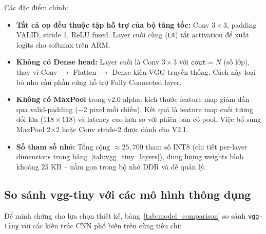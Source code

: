Các đặc điểm chính:
\begin{itemize}
    \item \textbf{Tất cả op đều thuộc tập hỗ trợ của bộ tăng tốc:} Conv $3 \times 3$, padding VALID, stride 1, ReLU fused. Layer cuối cùng (\texttt{L4}) tắt activation để xuất logits cho softmax trên ARM.
    \item \textbf{Không có Dense head:} Layer cuối là Conv $3 \times 3$ với $\texttt{cout} = N$ (số lớp), thay vì Conv $\to$ Flatten $\to$ Dense kiểu VGG truyền thống. Cách này loại bỏ nhu cầu phần cứng hỗ trợ Fully Connected layer.
    \item \textbf{Không có MaxPool} trong v2.0 alpha: kích thước feature map giảm dần qua valid-padding ($-2$ pixel mỗi chiều). Kết quả là feature map cuối tương đối lớn ($118 \times 118$) và latency cao hơn so với phiên bản có pool. Việc bổ sung MaxPool 2$\times$2 hoặc Conv stride-2 được dành cho V2.1.
    \item \textbf{Số tham số nhỏ:} Tổng cộng $\approx 25{,}700$ tham số INT8 (chi tiết per-layer dimensions trong bảng~\ref{tab:vgg_tiny_layers}), dung lượng weights blob khoảng 25 KB -- nằm gọn trong bộ nhớ DDR và dễ quản lý.
\end{itemize}

\subsection{So sánh vgg-tiny với các mô hình thông dụng}
Để minh chứng cho lựa chọn thiết kế, bảng~\ref{tab:model_comparison} so sánh \texttt{vgg-tiny} với các kiến trúc CNN phổ biến trên cùng tiêu chí:

\begin{table}[h]
\centering
\caption{So sánh vgg-tiny với các mạng CNN phổ biến}
\label{tab:model_comparison}
\end{table}

